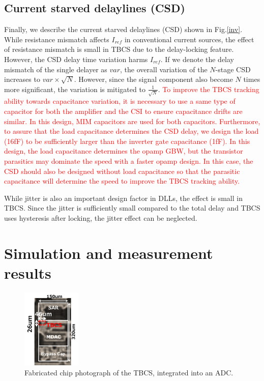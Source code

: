 \documentclass[paper]{ieice}
\begin{document}
\subsection{Current starved delaylines (CSD)}

\qquad Finally, we describe the current starved delaylines (CSD) shown in Fig.\ref{inv}. While resistance mismatch affects $I_{ref}$ in conventional current sources, the effect of resistance mismatch is small in TBCS due to the delay-locking feature. However, the CSD delay time variation harms $I_{ref}$.
If we denote the delay mismatch of the single delayer as $var$, the overall variation of the $N$-stage CSD increases to $var \times \sqrt{N}$. However, since the signal component also become  $N$ times more significant, the variation is mitigated to $\frac{1}{\sqrt{N}}$.
\textcolor{red}{To improve the TBCS tracking ability towards capacitance variation, it is necessary to use a same type of capacitor for both the amplifier and the CSI to ensure capacitance drifts are similar. In this design, MIM capacitors are used for both capacitors. Furthermore, to assure that the load capacitance determines the CSD delay, we design the load (16fF) to be sufficiently larger than the inverter gate capacitance (1fF).
In this design, the load capacitance determines the opamp GBW, but the transistor parasitics may dominate the speed with a faster opamp design. In this case, the CSD should also be designed without load capacitance so that the parasitic capacitance will determine the speed to improve the TBCS tracking ability.}

While jitter is also an important design factor in DLLs, the effect is small in TBCS. Since the jitter is sufficiently small compared to the total delay and TBCS uses hysteresis after locking, the jitter effect can be neglected.

\section{Simulation and measurement results}
\begin{figure}[!t]
\centering
 \includegraphics[width=0.25\textwidth]{figs/chipphoto.png}
  \caption{Fabricated chip photograph of the TBCS, integrated into an ADC.}
\label{chip}
\end{figure}
\end{document}
